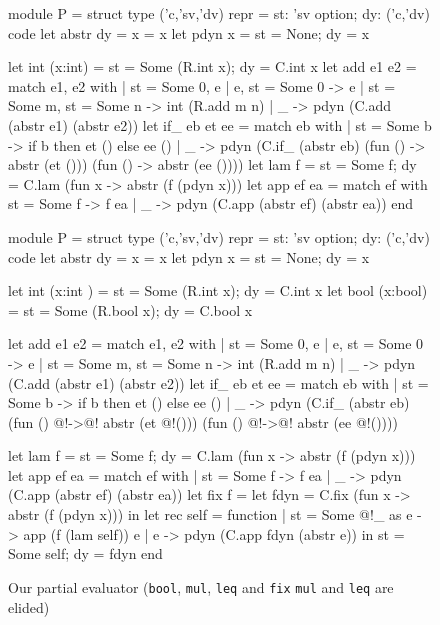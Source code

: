 \begin{figure}
\begin{floatrule}
\ifshort
\begin{code2}
module P = struct
  type ('c,'sv,'dv) repr = {st: 'sv option; dy: ('c,'dv) code}
  let abstr {dy = x} = x    let pdyn x = {st = None; dy = x}

  let int  (x:int)  = {st = Some (R.int x);  dy = C.int x}
  let add e1 e2 = match e1, e2 with
  | {st = Some 0}, e | e, {st = Some 0} -> e
  | {st = Some m}, {st = Some n} -> int (R.add m n)
  | _ -> pdyn (C.add (abstr e1) (abstr e2))
  let if_ eb et ee = match eb with
  | {st = Some b} -> if b then et () else ee ()
  | _ -> pdyn (C.if_ (abstr eb) (fun () -> abstr (et ()))
                                (fun () -> abstr (ee ())))
  let lam f = {st = Some f; dy = C.lam (fun x -> abstr (f (pdyn x)))}
  let app ef ea = match ef with {st = Some f} -> f ea
                  | _ -> pdyn (C.app (abstr ef) (abstr ea)) end
\end{code2}
\else
\begin{code2}[commandchars=\@\[\]]
module P = struct
  type ('c,'sv,'dv) repr = {st: 'sv option; dy: ('c,'dv) code}
  let abstr {dy = x} = x
  let pdyn x = {st = None; dy = x}

  let int  (x:int ) = {st = Some (R.int  x); dy = C.int  x}
  let bool (x:bool) = {st = Some (R.bool x); dy = C.bool x}

  let add e1 e2 = match e1, e2 with
                  | {st = Some 0}, e | e, {st = Some 0} -> e
                  | {st = Some m}, {st = Some n} -> int (R.add m n)
                  | _ -> pdyn (C.add (abstr e1) (abstr e2))
  let if_ eb et ee = match eb with
                     | {st = Some b} -> if b then et () else ee ()
                     | _ -> pdyn (C.if_ (abstr eb) (fun () @!->@! abstr (et @!()))
                                                   (fun () @!->@! abstr (ee @!())))

  let lam f = {st = Some f; dy = C.lam (fun x -> abstr (f (pdyn x)))}
  let app ef ea = match ef with
                  | {st = Some f} -> f ea
                  | _ -> pdyn (C.app (abstr ef) (abstr ea))
  let fix f = let fdyn = C.fix (fun x -> abstr (f (pdyn x)))
              in let rec self = function
                                | {st = Some @!_} as e -> app (f (lam self)) e
                                | e -> pdyn (C.app fdyn (abstr e))
                 in {st = Some self; dy = fdyn}
end
\end{code2}
\fi
\end{floatrule}
\caption{Our partial evaluator (\ifshort \texttt{bool}, \texttt{mul},
  \texttt{leq} and \texttt{fix} \else \texttt{mul} and \texttt{leq} \fi
  are elided)}
\label{fig:pe}
\end{figure}

